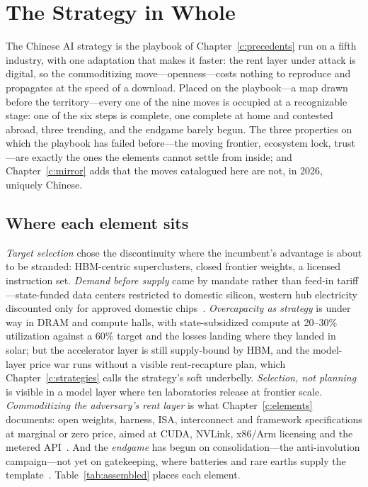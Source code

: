 \chapter{The Strategy in Whole}
\label{c:assembled}

\begin{glance}
The Chinese AI strategy is the playbook of Chapter~\ref{c:precedents} run on a fifth industry, with one adaptation that makes it faster: the rent layer under attack is digital, so the commoditizing move---openness---costs nothing to reproduce and propagates at the speed of a download. Placed on the playbook---a map drawn before the territory---every one of the nine moves is occupied at a recognizable stage: one of the six steps is complete, one complete at home and contested abroad, three trending, and the endgame barely begun. The three properties on which the playbook has failed before---the moving frontier, ecosystem lock, trust---are exactly the ones the elements cannot settle from inside; and Chapter~\ref{c:mirror} adds that the moves catalogued here are not, in 2026, uniquely Chinese. 
\end{glance}

\section{Where each element sits}

\emph{Target selection} chose the discontinuity where the incumbent's advantage is about to be stranded: HBM-centric superclusters, closed frontier weights, a licensed instruction set. \emph{Demand before supply} came by mandate rather than feed-in tariff---state-funded data centers restricted to domestic silicon, western hub electricity discounted only for approved domestic chips~\cite{cac-ban,datacenter-mandate}. \emph{Overcapacity as strategy} is under way in DRAM and compute halls, with state-subsidized compute at 20--30\% utilization against a 60\% target and the losses landing where they landed in solar; but the accelerator layer is still supply-bound by HBM, and the model-layer price war runs without a visible rent-recapture plan, which Chapter~\ref{c:strategies} calls the strategy's soft underbelly. \emph{Selection, not planning} is visible in a model layer where ten laboratories release at frontier scale. \emph{Commoditizing the adversary's rent layer} is what Chapter~\ref{c:elements} documents: open weights, harness, ISA, interconnect and framework specifications at marginal or zero price, aimed at CUDA, NVLink, x86/Arm licensing and the metered API~\cite{action-plan,riscv-policy}. And the \emph{endgame} has begun on consolidation---the anti-involution campaign---not yet on gatekeeping, where batteries and rare earths supply the template~\cite{mofcom-battery-controls}. Table~\ref{tab:assembled} places each element.

